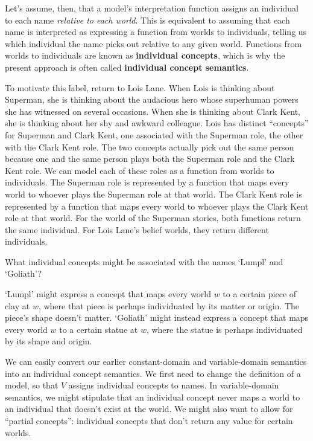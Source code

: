Let's assume, then, that a model's interpretation function assigns an individual
to each name \emph{relative to each world}. This is equivalent to assuming that
each name is interpreted as expressing a function from worlds to individuals,
telling us which individual the name picks out relative to any given world.
Functions from worlds to individuals are known as \textbf{individual concepts},
which is why the present approach is often called \textbf{individual concept
  semantics}.

To motivate this label, return to Lois Lane. When Lois is thinking about
Superman, she is thinking about the audacious hero whose superhuman powers she
has witnessed on several occasions. When she is thinking about Clark Kent, she
is thinking about her shy and awkward colleague. Lois has distinct ``concepts''
for Superman and Clark Kent, one associated with the Superman role, the other
with the Clark Kent role. The two concepts actually pick out the same person
because one and the same person plays both the Superman role and the Clark Kent
role. We can model each of these roles as a function from worlds to individuals.
The Superman role is represented by a function that maps every world to whoever
plays the Superman role at that world. The Clark Kent role is represented by a
function that maps every world to whoever plays the Clark Kent role at that
world. For the world of the Superman stories, both functions return the same
individual. For Lois Lane's belief worlds, they return different individuals.

\begin{exercise}
  What individual concepts might be associated with the names `Lumpl' and
  `Goliath'?
\end{exercise}
\begin{solution}
  `Lumpl' might express a concept that maps every world $w$ to a certain piece
  of clay at $w$, where that piece is perhaps individuated by its matter or
  origin. The piece's shape doesn't matter. `Goliath' might instead express a concept that maps every world $w$ to a certain statue at $w$, where the statue is perhaps individuated by its shape and origin.
\end{solution}

We can easily convert our earlier constant-domain and variable-domain semantics
into an individual concept semantics. We first need  to change the definition of a
model, so that $V$ assigns individual concepts to names. In variable-domain
semantics, we might stipulate that an individual concept never maps a world to
an individual that doesn't exist at the world. We might also want to allow for
``partial concepts'': individual concepts that don't return any value for
certain worlds.

